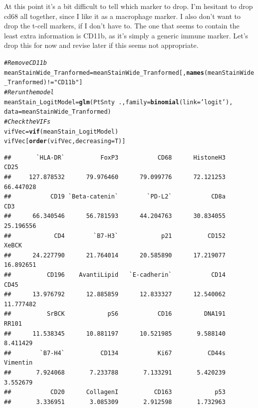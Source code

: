 \documentclass[a4paper]{article}\usepackage[]{graphicx}\usepackage[]{color}
\makeatletter
\newcommand{\hlstr}[1]{\textcolor[rgb]{0.192,0.494,0.8}{#1}}%
\newcommand{\hlcom}[1]{\textcolor[rgb]{0.678,0.584,0.686}{\textit{#1}}}%
\newcommand{\hlopt}[1]{\textcolor[rgb]{0,0,0}{#1}}%
\newcommand{\hlstd}[1]{\textcolor[rgb]{0.345,0.345,0.345}{#1}}%
\newcommand{\hlkwb}[1]{\textcolor[rgb]{0.69,0.353,0.396}{#1}}%
\newcommand{\hlkwc}[1]{\textcolor[rgb]{0.333,0.667,0.333}{#1}}%
\newcommand{\hlkwd}[1]{\textcolor[rgb]{0.737,0.353,0.396}{\textbf{#1}}}%
\newenvironment{kframe}{%
 \def\at@end@of@kframe{}%
 \ifinner\ifhmode%
  \def\at@end@of@kframe{\end{minipage}}%
  \begin{minipage}{\columnwidth}%
 \fi\fi%
 \def\FrameCommand##1{\hskip\@totalleftmargin \hskip-\fboxsep
 \colorbox{shadecolor}{##1}\hskip-\fboxsep
     \hskip-\linewidth \hskip-\@totalleftmargin \hskip\columnwidth}%
 \MakeFramed {\advance\hsize-\width
   \@totalleftmargin\z@ \linewidth\hsize
   \@setminipage}}%
 {\par\unskip\endMakeFramed%
 \at@end@of@kframe}
\newenvironment{knitrout}{}{} %
\makeatother
\begin{document}
At this point it's a bit difficult to tell which marker to drop. I'm hesitant to drop cd68 all together, since I like it as a macrophage marker. I also don't want to drop the t-cell markers, if I don't have to. The one that seems to contain the least extra information is CD11b, as it's simply a generic immune marker. Let's drop this for now and revise later if this seems not appropriate.
\begin{knitrout}
\color{fgcolor}\begin{kframe}
\begin{alltt}
\hlcom{# Remove CD11b}
\hlstd{meanStainWide_Tranformed} \hlkwb{=} \hlstd{meanStainWide_Tranformed[,}\hlkwd{names}\hlstd{(meanStainWide_Tranformed)}\hlopt{!=}\hlstr{"CD11b"}\hlstd{]}
\hlcom{# Rerun the model}
\hlstd{meanStain_LogitModel} \hlkwb{=} \hlkwd{glm}\hlstd{(PtSnty} \hlopt{~}\hlstd{.,}\hlkwc{family}\hlstd{=}\hlkwd{binomial}\hlstd{(}\hlkwc{link}\hlstd{=}\hlstr{'logit'}\hlstd{),}
                           \hlkwc{data}\hlstd{=meanStainWide_Tranformed)}
\hlcom{# Check the VIFs}
\hlstd{vifVec} \hlkwb{=} \hlkwd{vif}\hlstd{(meanStain_LogitModel)}
\hlstd{vifVec[}\hlkwd{order}\hlstd{(vifVec,}\hlkwc{decreasing}\hlstd{=T)]}
\end{alltt}
\begin{verbatim}
##       `HLA-DR`          FoxP3           CD68      HistoneH3           CD25 
##     127.878532      79.976460      79.099776      72.121253      66.447028 
##           CD19 `Beta-catenin`        `PD-L2`           CD8a            CD3 
##      66.340546      56.781593      44.204763      30.834055      25.196556 
##            CD4        `B7-H3`            p21          CD152          XeBCK 
##      24.227790      21.764014      20.585890      17.219077      16.892651 
##          CD196    AvantiLipid   `E-cadherin`           CD14           CD45 
##      13.976792      12.885859      12.833327      12.540062      11.777482 
##          SrBCK            pS6           CD16         DNA191          RR101 
##      11.538345      10.881197      10.521985       9.588140       8.411429 
##        `B7-H4`          CD134           Ki67          CD44s       Vimentin 
##       7.924068       7.233788       7.133291       5.420239       3.552679 
##           CD20      CollagenI          CD163            p53 
##       3.336951       3.085309       2.912598       1.732963
\end{verbatim}
\end{kframe}
\end{knitrout}
\end{document}
